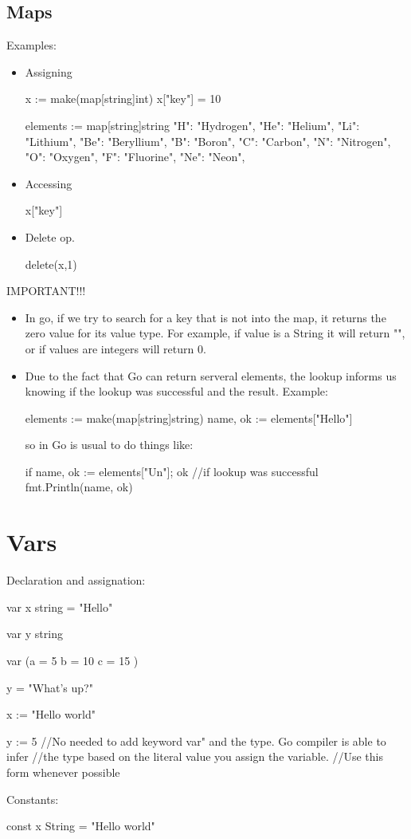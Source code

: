 \documentclass[twoside,a4paper,english]{report}
\begin{document}
\section{Maps}
Examples:
\begin{itemize}
\item Assigning
\begin{go}
x := make(map[string]int)
x["key"] = 10

elements := map[string]string{
  "H": "Hydrogen",
  "He": "Helium",
  "Li": "Lithium",
  "Be": "Beryllium",
  "B": "Boron",
  "C": "Carbon",
  "N": "Nitrogen",
  "O": "Oxygen",
  "F": "Fluorine",
  "Ne": "Neon",
}
\end{go}
\item Accessing
\begin{go}
x["key"]
\end{go}
\item Delete op.
\begin{go}
delete(x,1)
\end{go}
\end{itemize}
{\color{my_blue}IMPORTANT!!!}
\begin{itemize}
\item In go, if we try to search for a key that is not into the map, it returns the zero value for its value type. For example, if value is a String it will return "", or if values are integers will return 0.
\item Due to the fact that Go can return serveral elements, the lookup informs us knowing if the lookup was successful and the result. Example:
\begin{go}
elements := make(map[string]string)
name, ok := elements["Hello"]
\end{go}
so in Go is usual to do things like:
\begin{go}
if name, ok := elements["Un"]; ok {
  //if lookup was successful
  fmt.Println(name, ok)
}
\end{go}
\end{itemize}
\chapter{Vars}
Declaration and assignation:
\begin{go}
var x string = "Hello"

var y string

var (a = 5
     b = 10
     c = 15 )

y = "What's up?"

x := "Hello world"

y := 5 //No needed to add keyword var" and the type. Go compiler is able to infer 
       //the type based on the literal value you assign the variable. 
       //Use this form whenever possible
\end{go}
Constants:
\begin{go}
const x String = "Hello world"
\end{go}
\end{document}
